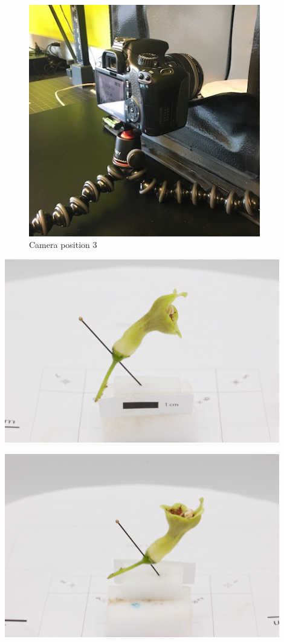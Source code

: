 \documentclass[
]{book}
\begin{document}
\begin{figure}
\centering
\includegraphics[width=0.9\textwidth,height=\textheight]{Figures/camera_position_3.JPG}
\caption{Camera position 3}
\end{figure}

\includegraphics[width=0.9\textwidth,height=\textheight]{Figures/position_2.jpg}

\includegraphics[width=0.9\textwidth,height=\textheight]{Figures/position_5.jpg}
\end{document}
